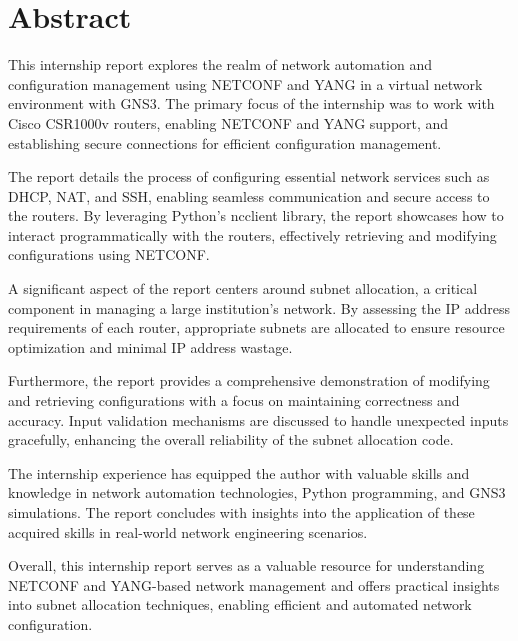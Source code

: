 \chapter{Abstract}

This internship report explores the realm of network automation and configuration management using NETCONF and YANG in a virtual network environment with GNS3. The primary focus of the internship was to work with Cisco CSR1000v routers, enabling NETCONF and YANG support, and establishing secure connections for efficient configuration management.

The report details the process of configuring essential network services such as DHCP, NAT, and SSH, enabling seamless communication and secure access to the routers. By leveraging Python's ncclient library, the report showcases how to interact programmatically with the routers, effectively retrieving and modifying configurations using NETCONF.

A significant aspect of the report centers around subnet allocation, a critical component in managing a large institution's network. By assessing the IP address requirements of each router, appropriate subnets are allocated to ensure resource optimization and minimal IP address wastage.

Furthermore, the report provides a comprehensive demonstration of modifying and retrieving configurations with a focus on maintaining correctness and accuracy. Input validation mechanisms are discussed to handle unexpected inputs gracefully, enhancing the overall reliability of the subnet allocation code.

The internship experience has equipped the author with valuable skills and knowledge in network automation technologies, Python programming, and GNS3 simulations. The report concludes with insights into the application of these acquired skills in real-world network engineering scenarios.

Overall, this internship report serves as a valuable resource for understanding NETCONF and YANG-based network management and offers practical insights into subnet allocation techniques, enabling efficient and automated network configuration.

